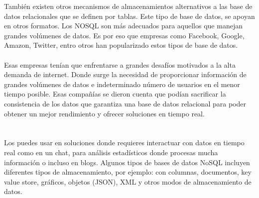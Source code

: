 \documentclass[twoside,twocolumn]{article}
\begin{document}
\begin{flushright}
\begin{itemize}
También existen otros mecanismos de almacenamientos alternativos a las base de datos relacionales que se definen por tablas. Este tipo de base de datos, se apoyan en otros formatos. Los NOSQL son más adecuados para aquellos que manejan grandes volúmenes de datos. Es por eso que empresas como Facebook, Google, Amazon, Twitter, entro otros han popularizado estos tipos de base de datos.\textbf{}\\
\textbf{}\\
Esas empresas tenían que enfrentarse a grandes desafíos motivados a la alta demanda de internet. Donde surge la necesidad de proporcionar información de grandes volúmenes de datos e indeterminado número de usuarios en el menor tiempo posible. Esas compañías se dieron cuenta que podían sacrificar la consistencia de los datos que garantiza una base de datos relacional para poder obtener un mejor rendimiento y ofrecer soluciones en tiempo real.\textbf{}\\
\textbf{}\\
\textbf{}\\
Los puedes usar en soluciones donde requieres interactuar con datos en tiempo real como en un chat, para análisis estadísticos donde procesas mucha información o incluso en blogs.
Algunos tipos de bases de datos NoSQL incluyen diferentes tipos de almacenamiento, por ejemplo: con columnas, documentos, key value store, gráficos, objetos (JSON), XML y otros modos de almacenamiento de datos.


\textbf{}\\
\textbf{}\\



\end{itemize}
\end{flushright}
\end{document}
